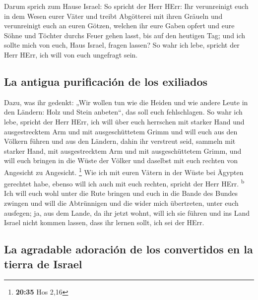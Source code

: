  Darum sprich zum Hause Israel: So spricht der Herr HErr:
Ihr verunreinigt euch in dem Wesen eurer Väter und treibt Abgötterei mit
ihren Gräueln  und verunreinigt euch an euren Götzen,
welchen ihr eure Gaben opfert und eure Söhne und Töchter durchs Feuer
gehen lasst, bis auf den heutigen Tag; und ich sollte mich von euch,
Haus Israel, fragen lassen? So wahr ich lebe, spricht der Herr HErr, ich
will von euch ungefragt sein.

\hypertarget{la-antigua-purificaciuxf3n-de-los-exiliados}{%
\subsection{La antigua purificación de los
exiliados}\label{la-antigua-purificaciuxf3n-de-los-exiliados}}

 Dazu, was ihr gedenkt: „Wir wollen tun wie die Heiden
und wie andere Leute in den Ländern: Holz und Stein anbeten``, das soll
euch fehlschlagen.  So wahr ich lebe, spricht der Herr
HErr, ich will über euch herrschen mit starker Hand und ausgestrecktem
Arm und mit ausgeschüttetem Grimm  und will euch aus den
Völkern führen und aus den Ländern, dahin ihr verstreut seid, sammeln
mit starker Hand, mit ausgestrecktem Arm und mit ausgeschüttetem Grimm,
 und will euch bringen in die Wüste der Völker und
daselbst mit euch rechten von Angesicht zu Angesicht. \footnote{\textbf{20:35}
  Hos 2,16}  Wie ich mit euren Vätern in der Wüste bei
Ägypten gerechtet habe, ebenso will ich auch mit euch rechten, spricht
der Herr HErr. \textsuperscript{b}  Ich will euch wohl
unter die Rute bringen und euch in die Bande des Bundes zwingen
 und will die Abtrünnigen und die wider mich übertreten,
unter euch ausfegen; ja, aus dem Lande, da ihr jetzt wohnt, will ich sie
führen und ins Land Israel nicht kommen lassen, dass ihr lernen sollt,
ich sei der HErr.

\hypertarget{la-agradable-adoraciuxf3n-de-los-convertidos-en-la-tierra-de-israel}{%
\subsection{La agradable adoración de los convertidos en la tierra de
Israel}\label{la-agradable-adoraciuxf3n-de-los-convertidos-en-la-tierra-de-israel}}

